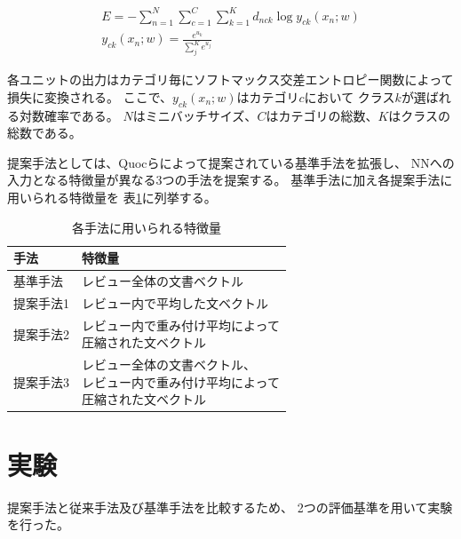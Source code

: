 \documentclass[twocolumn,a4paper]{ltjarticle}
\begin{document}
\begin{gather}
  E = - \sum^{N}_{n = 1} \sum^{C}_{c = 1} \sum^{K}_{k = 1}
        d_{nck} \log{y_{ck}(x_n; w)}
  \label{eq:NNObjective} \\
  y_{ck}(x_n; w) = \frac{e^{u_k}}{\sum^{K}_{j} e^{u_j}}
\end{gather}

各ユニットの出力はカテゴリ毎にソフトマックス交差エントロピー関数によって
損失に変換される。
ここで、$y_{ck}(x_n; w)$はカテゴリ$c$において
クラス$k$が選ばれる対数確率である。
$N$はミニバッチサイズ、$C$はカテゴリの総数、$K$はクラスの総数である。

提案手法としては、Quocら\cite{quoc14}によって提案されている基準手法を拡張し、
NNへの入力となる特徴量が異なる3つの手法を提案する。
基準手法に加え各提案手法に用いられる特徴量を
表\ref{tab:MethodFeatures}に列挙する。

\begin{table}
  \caption{各手法に用いられる特徴量}
  \centering
  \begin{tabular}{l | l} \label{tab:MethodFeatures}
    手法 & 特徴量 \\
    \hline
    基準手法  & レビュー全体の文書ベクトル \\
    提案手法1 & レビュー内で平均した文ベクトル \\
    提案手法2 & \makecell[l]{レビュー内で重み付け平均によって \\
                             圧縮された文ベクトル} \\
    提案手法3 & \makecell[l]{レビュー全体の文書ベクトル、\\
                             レビュー内で重み付け平均によって \\
                             圧縮された文ベクトル} \\
  \end{tabular}
\end{table}



\section{実験}

提案手法と従来手法\cite{fujitani15}及び基準手法を比較するため、
2つの評価基準を用いて実験を行った。
\end{document}
